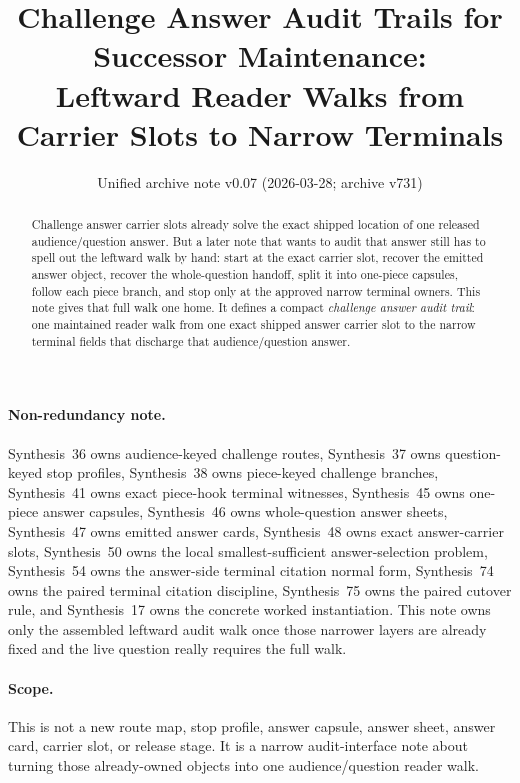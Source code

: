 \documentclass[11pt]{article}
\title{Challenge Answer Audit Trails for Successor Maintenance:\\[0.5ex]
\large Leftward Reader Walks from Carrier Slots to Narrow Terminals}
\author{}
\date{Unified archive note v0.07 (2026-03-28; archive v731)}
\begin{document}
\maketitle

\begin{abstract}
Challenge answer carrier slots already solve the exact shipped location of one released audience/question answer.
But a later note that wants to audit that answer still has to spell out the leftward walk by hand: start at the exact carrier slot, recover the emitted answer object, recover the whole-question handoff, split it into one-piece capsules, follow each piece branch, and stop only at the approved narrow terminal owners.
This note gives that full walk one home.
It defines a compact \emph{challenge answer audit trail}: one maintained reader walk from one exact shipped answer carrier slot to the narrow terminal fields that discharge that audience/question answer.
\end{abstract}

\paragraph{Non-redundancy note.}
Synthesis~36 owns audience-keyed challenge routes, Synthesis~37 owns question-keyed stop profiles, Synthesis~38 owns piece-keyed challenge branches, Synthesis~41 owns exact piece-hook terminal witnesses, Synthesis~45 owns one-piece answer capsules, Synthesis~46 owns whole-question answer sheets, Synthesis~47 owns emitted answer cards, Synthesis~48 owns exact answer-carrier slots, Synthesis~50 owns the local smallest-sufficient answer-selection problem, Synthesis~54 owns the answer-side terminal citation normal form, Synthesis~74 owns the paired terminal citation discipline, Synthesis~75 owns the paired cutover rule, and Synthesis~17 owns the concrete worked instantiation.
This note owns only the assembled leftward audit walk once those narrower layers are already fixed and the live question really requires the full walk.

\paragraph{Scope.}
This is not a new route map, stop profile, answer capsule, answer sheet, answer card, carrier slot, or release stage.
It is a narrow audit-interface note about turning those already-owned objects into one audience/question reader walk.
\end{document}

